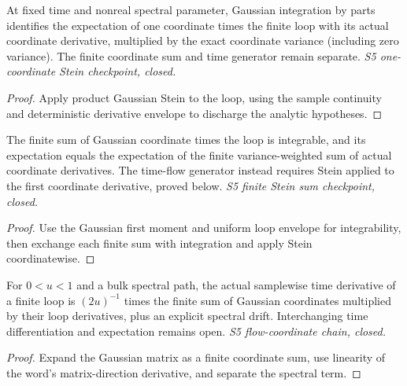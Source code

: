 \begin{lemma}
  \label{lem:loop-coordinate-stein}
  \leanok
  At fixed time and nonreal spectral parameter, Gaussian integration by
  parts identifies the expectation of one coordinate times the finite loop
  with its actual coordinate derivative, multiplied by the exact coordinate
  variance (including zero variance). The finite coordinate sum and time
  generator remain separate. \emph{S5 one-coordinate Stein checkpoint, closed.}
\end{lemma}
\begin{proof}\leanok
  Apply product Gaussian Stein to the loop, using the sample continuity and
  deterministic derivative envelope to discharge the analytic hypotheses.
\end{proof}

\begin{lemma}
  \label{lem:loop-coordinate-stein-sum}
  \leanok
  The finite sum of Gaussian coordinate times the loop is integrable, and
  its expectation equals the expectation of the finite variance-weighted
  sum of actual coordinate derivatives. The time-flow generator instead
  requires Stein applied to the first coordinate derivative, proved below.
  \emph{S5 finite Stein sum checkpoint, closed.}
\end{lemma}
\begin{proof}\leanok
  Use the Gaussian first moment and uniform loop envelope for integrability,
  then exchange each finite sum with integration and apply Stein coordinatewise.
\end{proof}

\begin{lemma}
  \label{lem:loop-flow-coordinate-chain}
  \leanok
  For $0<u<1$ and a bulk spectral path, the actual samplewise time
  derivative of a finite loop is $(2u)^{-1}$ times the finite sum of
  Gaussian coordinates multiplied by their loop derivatives, plus an
  explicit spectral drift. Interchanging time differentiation and
  expectation remains open. \emph{S5 flow-coordinate chain, closed.}
\end{lemma}
\begin{proof}\leanok
  Expand the Gaussian matrix as a finite coordinate sum, use linearity of
  the word's matrix-direction derivative, and separate the spectral term.
\end{proof}

